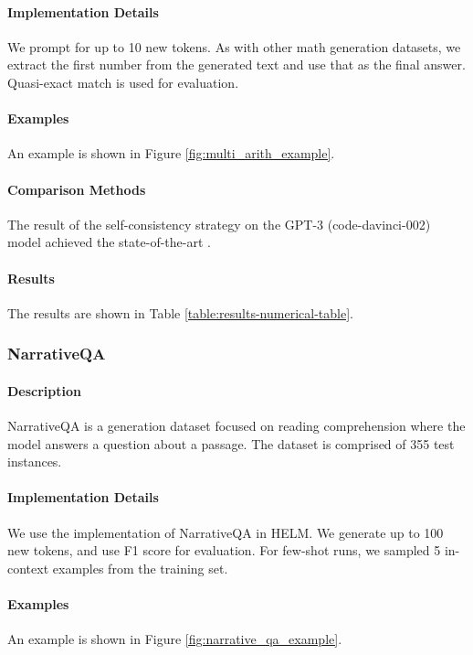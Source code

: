 \paragraph{Implementation Details}
We prompt for up to 10 new tokens. As with other math generation datasets, we extract the first number from the generated text and use that as the final answer. Quasi-exact match is used for evaluation.

\paragraph{Examples} An example is shown in Figure \ref{fig:multi_arith_example}.

\paragraph{Comparison Methods}
The result of the self-consistency strategy on the GPT-3 (code-davinci-002) model achieved the state-of-the-art \citep{wang2023selfconsistency}.

\paragraph{Results} The results are shown in Table \ref{table:results-numerical-table}.

\subsubsection{NarrativeQA} 
\paragraph{Description} NarrativeQA \citep{kocisky-etal-2018-narrativeqa} is a generation dataset focused on reading comprehension where the model answers a question about a passage. The dataset is comprised of 355 test instances.

\paragraph{Implementation Details}
We use the implementation of NarrativeQA in HELM. We generate up to 100 new tokens, and use F1 score for evaluation. For few-shot runs, we sampled 5 in-context examples from the training set.

\paragraph{Examples} An example is shown in Figure \ref{fig:narrative_qa_example}.

